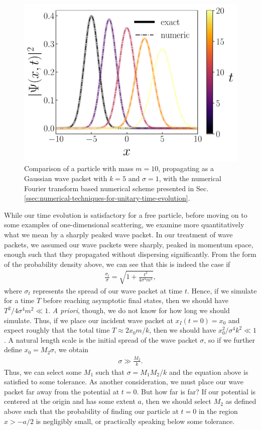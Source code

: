 \begin{figure}[tb]
    \centering
    \includegraphics[width=0.7\linewidth]{gauss_wave-prop.pdf}
    \caption{Comparison of a particle with mass $m = 10$, propagating as a Gaussian wave packet with $k = 5$ and $\sigma = 1$, with the numerical Fourier transform based numerical scheme presented in Sec. \ref{ssec:numerical-techniques-for-unitary-time-evolution}.}
    \label{fig:gauss-wave-prop}
\end{figure}

While our time evolution is satisfactory for a free particle, before moving on to some examples of one-dimensional scattering, we examine more quantitatively what we mean by a sharply peaked wave packet.
In our treatment of wave packets, we assumed our wave packets were sharply, peaked in momentum space, enough such that they propagated without dispersing significantly.
From the form of the probability density above, we can see that this is indeed the case if
\begin{align}
    \frac{\sigma_{t}}{\sigma} = \sqrt{1 + \frac{t^2}{4 \sigma^{4} m^2}}
,\end{align}
where $\sigma_{t}$ represents the spread of our wave packet at time $t$.
Hence, if we simulate for a time $T$ before reaching asymptotic final states, then we should have $T^2 / 4 \sigma^{4} m^2 \ll 1$.
\textit{A priori}, though, we do not know for how long we should simulate.
Thus, if we place our incident wave packet at $x_{I}(t = 0) = x_0$ and expect roughly that the total time $T \approx 2 x_0 m / k$, then we should have $x_0^2 / \sigma^{4} k^2 \ll 1$.
A natural length scale is the initial spread of the wave packet $\sigma$, so if we further define $x_0 = M_2 \sigma$, we obtain
\begin{align}
    \sigma \gg \frac{M_2}{k}
.\end{align}
Thus, we can select some $M_1$ such that $\sigma = M_1 M_2 / k$ and the equation above is satisfied to some tolerance.
As another consideration, we must place our wave packet far away from the potential at $t = 0$.
But how far is far?
If our potential is centered at the origin and has some extent $a$, then we should select $M_2$ as defined above such that the probability of finding our particle at $t = 0$ in the region $x > -a/2$ is negligibly small, or practically speaking below some tolerance.

